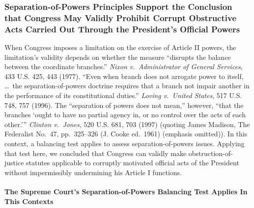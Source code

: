 \subsubsection{Separation-of-Powers Principles Support the Conclusion that Congress May Validly Prohibit Corrupt Obstructive Acts Carried Out Through the President's Official Powers}

When Congress imposes a limitation on the exercise of Article II powers, the limitation's validity depends on whether the measure ``disrupts the balance between the coordinate branches.''
\textit{Nixon v.\ Administrator of General Services}, 433 U.S. 425, 443 (1977).
``Even when branch does not arrogate power to itself, \dots\ the separation-of-powers doctrine requires that a branch not impair another in the performance of its constitutional duties.''
\textit{Loving v.\ United States}, 517 U.S. 748, 757 (1996).
The ``separation of powers does not mean,'' however, ``that the branches `ought to have no partial agency in, or no control over the acts of each other.'{}''
\textit{Clinton v.\ Jones}, 520 U.S. 681, 703 (1997) (quoting James Madison, The Federalist No.~47, pp.~325--326 (J. Cooke ed.~1961) (emphasis omitted)).
In this context, a balancing test applies to assess separation-of-powers issues.
Applying that test here, we concluded that Congress can validly make obstruction-of-justice statutes applicable to corruptly motivated official acts of the President without impermissibly undermining his Article I functions.

\paragraph{The Supreme Court's Separation-of-Powers Balancing Test Applies In This Contexts}

